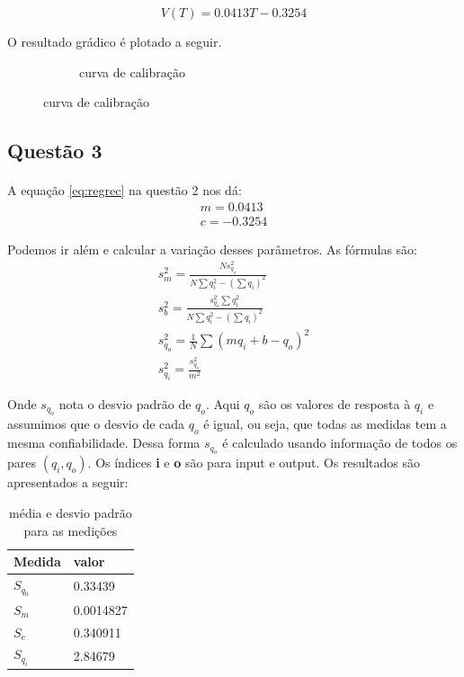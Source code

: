 \documentclass[a4paper,11pt]{article}
\begin{document}
\begin{equation}
	V(T) = 0.0413 T -0.3254
	\label{eq:regrec}
\end{equation}

O resultado grádico é plotado a seguir.
\FloatBarrier
\begin{figure}[!htp]
    \begin{subfigure}[!htp]{0.3\textwidth}
        
        \caption{curva de calibração}
        \label{graph-1}  
    \end{subfigure}
\end{figure}
\FloatBarrier
\subsection{Questão 3}
\paragraph{} A equação \ref{eq:regrec} na questão 2 nos dá:
\begin{equation}
	\begin{array}{l}
	m = 0.0413 \\
	c = -0.3254
	\end{array}
	\label{qe:MeC}
\end{equation}

Podemos ir além e calcular a variação desses parâmetros. As fórmulas são:
\begin{equation}
	\begin{array}{l}
	s_m^2 = \frac{Ns_{q_o}^2}{N\sum q_i^2 - (\sum q_i)^2} \\
	s_b^2 = \frac{s_{q_o}^2 \sum q_i^2}{N\sum q_i^2 - (\sum q_i)^2}\\
	s_{q_o}^2 = \frac{1}{N} \sum (mq_i + b -q_o)^2	 \\
	s_{q_i}^2 = \frac{s_{q_o}^2}{m^2}
	\end{array}
\end{equation}

Onde $s_{q_o}$ nota o desvio padrão de $q_o$. Aqui $q_o$ são os valores de resposta à $q_i$ e assumimos que
o desvio de cada $q_o$ é igual, ou seja, que todas as medidas tem a mesma confiabilidade. Dessa forma $s_{q_o}$ é 
calculado usando informação de todos os pares $(q_i, q_o)$. Os índices \textbf{i} e \textbf{o} são para input e output. 
Os resultados são apresentados a seguir:

\FloatBarrier
\begin{table}[!htp]
		\centering
		\begin{tabular}{|l|l|} \hline
			Medida		& 			valor \\ \hline
			$S_{q_0}$	& 		0.33439	\\ \hline
			$S_m$			&       	0.0014827	\\ \hline
			$S_c$			&  		0.340911	\\ \hline
			$S_{q_i}$  	& 		2.84679 \\ \hline
		\end{tabular}
		\caption{média e desvio padrão para as medições}
\end{table}
\FloatBarrier
\end{document}
